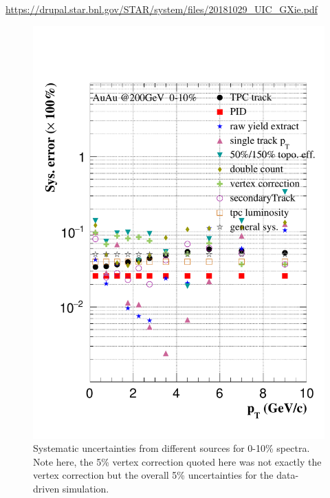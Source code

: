 \url{https://drupal.star.bnl.gov/STAR/system/files/20181029_UIC_GXie.pdf}

\begin{figure}[htbp]
\begin{minipage}[htbp]{0.47\linewidth}
\centering
\includegraphics[width=1.0\textwidth,angle=0]{figure/Run14_D0HFT/sysErr_0_10_2.pdf}
\caption{ Systematic uncertainties from different sources for 0-10\% spectra. Note here, the 5\% vertex correction quoted here was not exactly the vertex correction but the overall 5\% uncertainties for the data-driven simulation. \label{sysErr_0_10}}
\end{minipage}
\hfill
\begin{minipage}[htbp]{0.47\linewidth}
\centering

\end{minipage}
\end{figure}
